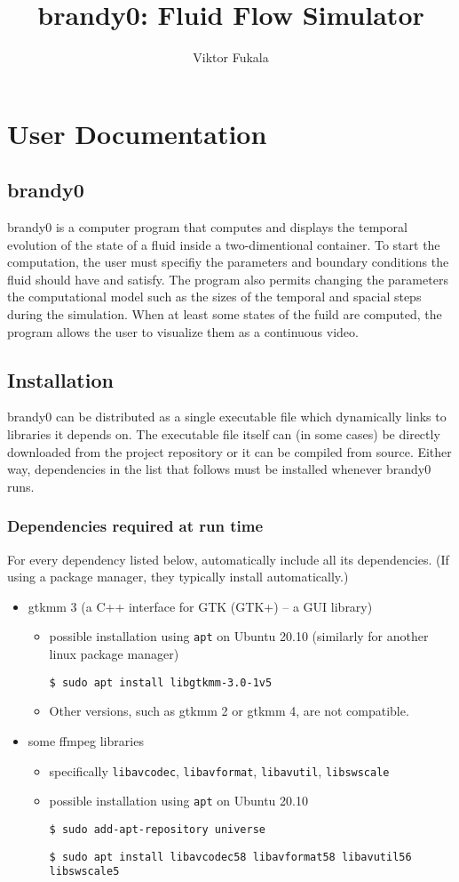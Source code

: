 \documentclass{article}
\newcommand{\icd}[1]{\texttt{#1}}
\newcommand{\ccd}[1]{\colorbox{gray!15!white}{\texttt{#1}}}
\newcommand{\scd}[1]{
	\vspace*{5pt}

	\ccd{#1}
	\vspace*{5pt}
}
\newcommand{\sscd}[1]{\scd{\$ sudo #1}}
\newcommand{\aptinstall}[1]{\sscd{apt install #1}}
\newcommand{\defos}{Ubuntu 20.10}
\newcommand{\pubinst}{possible installation using \icd{apt} on \defos}
\newcommand{\pname}{brandy0}
\begin{document}
\author{Viktor Fukala}
\title{\pname: Fluid Flow Simulator}
\maketitle

\section{User Documentation}
\subsection{\pname}
\pname{} is a computer program that computes and displays the temporal evolution of the state of a fluid inside a two-dimentional container. To start the computation, the user must specifiy the parameters and boundary conditions the fluid should have and satisfy. The program also permits changing the parameters the computational model such as the sizes of the temporal and spacial steps during the simulation. When at least some states of the fuild are computed, the program allows the user to visualize them as a continuous video.

\subsection{Installation}

\pname{} can be distributed as a single executable file which dynamically links to libraries it depends on. The executable file itself can (in some cases) be directly downloaded from the project repository or it can be compiled from source. Either way, dependencies in the list that follows must be installed whenever \pname{} runs.

\subsubsection{Dependencies required at run time}\label{sec:runtimedeps}
For every dependency listed below, automatically include all its dependencies. (If using a package manager, they typically install automatically.)
\begin{itemize}
	\item gtkmm 3 (a C++ interface for GTK (GTK+) -- a GUI library)
		\begin{itemize}
			\item \pubinst{} (similarly for another linux package manager)
				\aptinstall{libgtkmm-3.0-1v5}
			\item Other versions, such as gtkmm 2 or gtkmm 4, are not compatible.
		\end{itemize}
	\item some ffmpeg libraries
		\begin{itemize}
			\item specifically \icd{libavcodec}, \icd{libavformat}, \icd{libavutil}, \icd{libswscale}
			\item \pubinst
				\sscd{add-apt-repository universe}
				\aptinstall{libavcodec58 libavformat58 libavutil56 libswscale5}
		\end{itemize}
\end{itemize}
\end{document}
